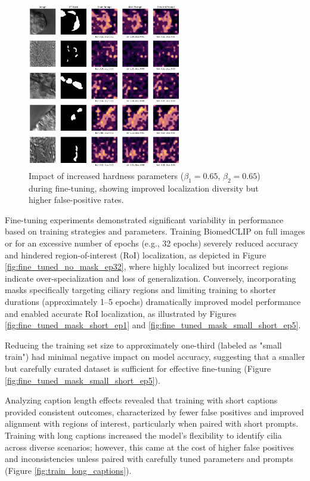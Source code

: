 \documentclass[./dissertation.tex]{subfiles}
\begin{document}
\begin{figure}
    \centering
    \includegraphics[width=0.6\textwidth]{figures/sam/fine-tuned masks long captions small train 01 09 095 005.png}
    \caption{Impact of increased hardness parameters (\(\beta_1=0.65\), \(\beta_2=0.65\)) during fine-tuning, showing improved localization diversity but higher false-positive rates.}
    \label{fig:fine_tuned_masks_small_train_01_09_095_005}
\end{figure}



Fine-tuning experiments demonstrated significant variability in performance based on training strategies and parameters. Training BiomedCLIP on full images or for an excessive number of epochs (e.g., 32 epochs) severely reduced accuracy and hindered region-of-interest (RoI) localization, as depicted in Figure \ref{fig:fine_tuned_no_mask_ep32}, where highly localized but incorrect regions indicate over-specialization and loss of generalization. Conversely, incorporating masks specifically targeting ciliary regions and limiting training to shorter durations (approximately 1–5 epochs) dramatically improved model performance and enabled accurate RoI localization, as illustrated by Figures \ref{fig:fine_tuned_mask_short_ep1} and \ref{fig:fine_tuned_mask_small_short_ep5}.

Reducing the training set size to approximately one-third (labeled as "small train") had minimal negative impact on model accuracy, suggesting that a smaller but carefully curated dataset is sufficient for effective fine-tuning (Figure \ref{fig:fine_tuned_mask_small_short_ep5}).

Analyzing caption length effects revealed that training with short captions provided consistent outcomes, characterized by fewer false positives and improved alignment with regions of interest, particularly when paired with short prompts. Training with long captions increased the model's flexibility to identify cilia across diverse scenarios; however, this came at the cost of higher false positives and inconsistencies unless paired with carefully tuned parameters and prompts (Figure \ref{fig:train_long_captions}).
\end{document}
